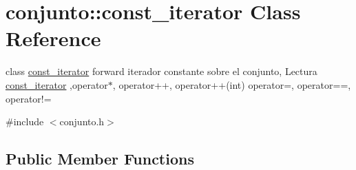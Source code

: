 \hypertarget{classconjunto_1_1const__iterator}{}\section{conjunto\+:\+:const\+\_\+iterator Class Reference}
\label{classconjunto_1_1const__iterator}


class \hyperlink{classconjunto_1_1const__iterator}{const\+\_\+iterator} forward iterador constante sobre el conjunto, Lectura \hyperlink{classconjunto_1_1const__iterator}{const\+\_\+iterator} ,operator$\ast$, operator++, operator++(int) operator=, operator==, operator!=  




{\ttfamily \#include $<$conjunto.\+h$>$}

\subsection*{Public Member Functions}
